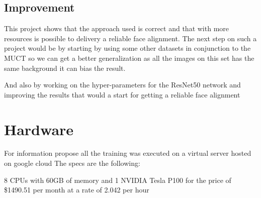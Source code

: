 \documentclass[11pt]{article}
\begin{document}
\subsection{Improvement}
\label{sec:org6c93fce}
This project shows that the approach used is correct and that with more
resources is possible to delivery a reliable face alignment. 
The next step on such a project would be by starting by using some other
datasets in conjunction to the MUCT so we can get a better generalization as
all the images on this set has the same background it can bias the result. 

And also by working on the hyper-parameters for the ResNet50 network and
improving the results that would a start for getting a reliable face alignment 

\section{Hardware}
\label{sec:org3a80c39}

For information propose all the training was executed on a virtual server
hosted on google cloud
The specs are the following:

8 CPUs with 60GB of memory and 1 NVIDIA Tesla P100 for the price of \$1490.51
per month at a rate of 2.042 per hour













\end{document}
